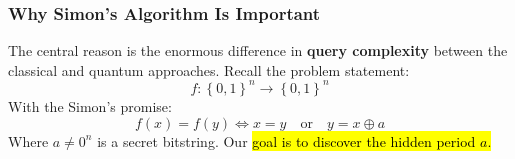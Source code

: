 \subsubsection{Why Simon's Algorithm Is Important}\label{sec:why-simons-algorithm-is-important}

The central reason is the enormous difference in \textbf{query complexity} between the classical and quantum approaches. Recall the problem statement:
\begin{equation*}
    f : \left\{ 0, 1 \right\}^n \to \left\{ 0, 1 \right\}^n
\end{equation*}
With the Simon's promise:
\begin{equation*}
    f(x) = f(y) \iff x = y \quad \text{or} \quad y = x \oplus a
\end{equation*}
Where $a \neq 0^n$ is a secret bitstring. Our \hl{goal is to discover the hidden period $a$.}
